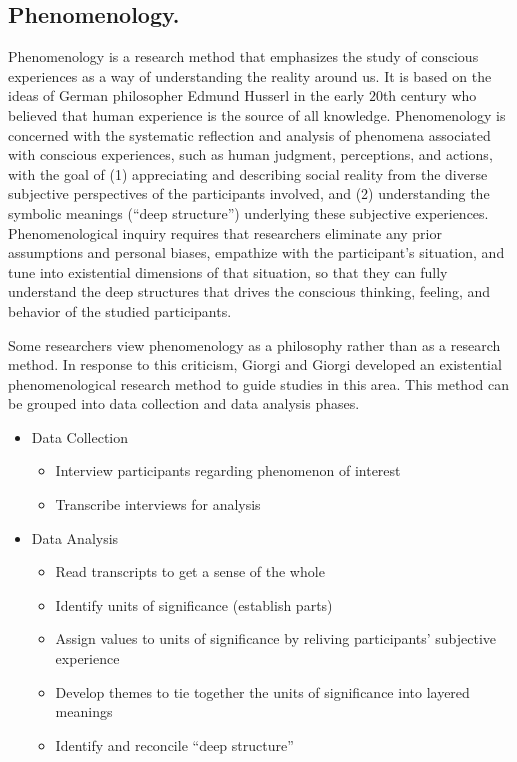\subsection{Phenomenology.} Phenomenology is a research method that emphasizes the study of conscious experiences as a way of understanding the reality around us. It is based on the ideas of German philosopher Edmund Husserl in the early $ 20 $th century who believed that human experience is the source of all knowledge. Phenomenology is concerned with the systematic reflection and analysis of phenomena associated with conscious experiences, such as human judgment, perceptions, and actions, with the goal of (1) appreciating and describing social reality from the diverse subjective perspectives of the participants involved, and (2) understanding the symbolic meanings (``deep structure'') underlying these subjective experiences. Phenomenological inquiry requires that researchers eliminate any prior assumptions and personal biases, empathize with the participant's situation, and tune into existential dimensions of that situation, so that they can fully understand the deep structures that drives the conscious thinking, feeling, and behavior of the studied participants.

Some researchers view phenomenology as a philosophy rather than as a research method. In response to this criticism, Giorgi and Giorgi\cite{giorgi2003phenomenology} developed an existential phenomenological research method to guide studies in this area. This method can be grouped into data collection and data analysis phases. 

\begin{itemize}
	\item Data Collection
	\begin{itemize}
		\item Interview participants regarding phenomenon of interest
		\item Transcribe interviews for analysis
	\end{itemize}
	\item Data Analysis
	\begin{itemize}
		\item Read transcripts to get a sense of the whole
		\item Identify units of significance (establish parts)
		\item Assign values to units of significance by reliving participants' subjective experience
		\item Develop themes to tie together the units of significance into layered meanings
		\item Identify and reconcile ``deep structure''
	\end{itemize}
\end{itemize}

